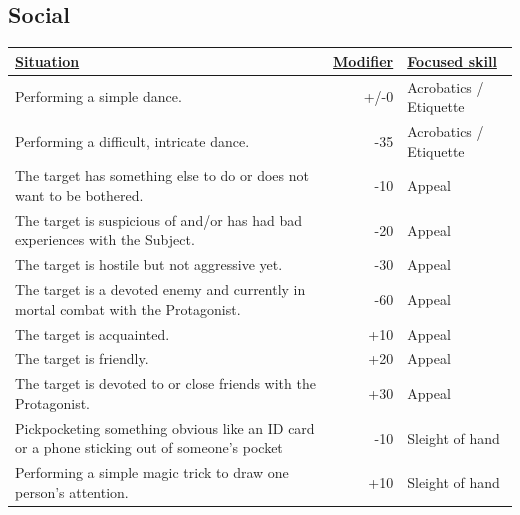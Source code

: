\subsection{Social}
\begin{tabularx}{\textwidth}{|X|r|l|}
	\hline
	\ul{Situation} & \ul{Modifier} & \ul{Focused skill} \\ \hline
	Performing a simple dance. & +/-0 & Acrobatics / Etiquette \\ \hline
	Performing a difficult, intricate dance. & -35 & Acrobatics / Etiquette \\ \hline
	The target has something else to do or does not want to be bothered. & -10 & Appeal \\ \hline
	The target is suspicious of and/or has had bad experiences with the Subject. & -20 & Appeal \\ \hline
	The target is hostile but not aggressive yet. & -30 & Appeal \\ \hline
	The target is a devoted enemy and currently in mortal combat with the Protagonist. & -60 & Appeal \\ \hline
	The target is acquainted. & +10 & Appeal \\ \hline
	The target is friendly. & +20 & Appeal \\ \hline
	The target is devoted to or close friends with the Protagonist. & +30 & Appeal \\ \hline
	Pickpocketing something obvious like an ID card or a phone sticking out of someone's pocket & -10 & Sleight of hand \\ \hline
	Performing a simple magic trick to draw one person's attention. & +10 & Sleight of hand \\ \hline
\end{tabularx}

